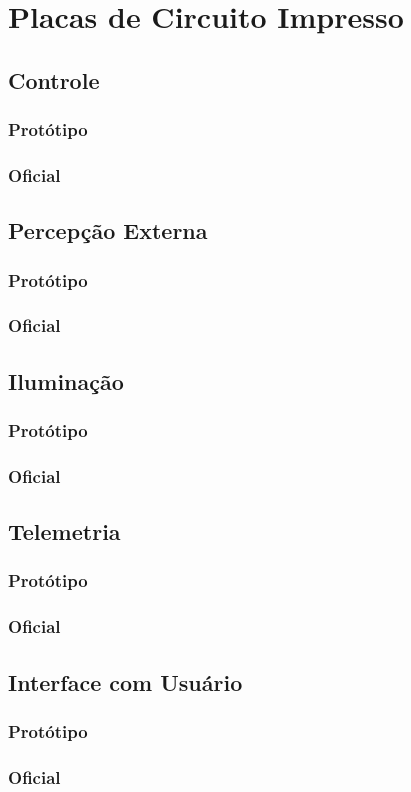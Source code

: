 \documentclass[../delivery_hospital_report.tex]{subfiles}
\begin{document}
\chapter{Placas de Circuito Impresso}
\section{Controle}
\subsection{Protótipo}
\subsection{Oficial}
\section{Percepção Externa}
\subsection{Protótipo}
\subsection{Oficial}
\section{Iluminação}
\subsection{Protótipo}
\subsection{Oficial}
\section{Telemetria}
\subsection{Protótipo}
\subsection{Oficial}
\section{Interface com Usuário}
\subsection{Protótipo}
\subsection{Oficial}
\end{document}
